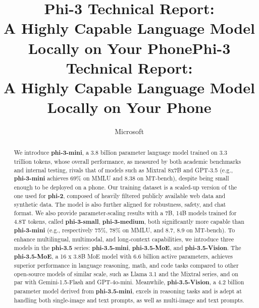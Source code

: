 \title{Phi-3 Technical Report: \\
A Highly Capable Language Model Locally on Your Phone}



\title{Phi-3 Technical Report: \\
A Highly Capable Language Model Locally on Your Phone}

\author{Microsoft}
\date{}

\maketitle

\begin{abstract}
We introduce \textbf{phi-3-mini}, a 3.8 billion parameter language model trained on 3.3 trillion tokens, whose overall performance, as measured by both academic benchmarks and internal testing, rivals that of models such as Mixtral 8x7B and GPT-3.5 (e.g., \textbf{phi-3-mini} achieves 69\% on MMLU and 8.38 on MT-bench), despite being small enough to be deployed on a phone. Our training dataset is a scaled-up version of the one used for \textbf{phi-2}, composed of heavily filtered publicly available web data and synthetic data. The model is also further aligned for robustness, safety, and chat format.
We also provide parameter-scaling results with a 7B, 14B models trained for 4.8T tokens, called \textbf{phi-3-small}, \textbf{phi-3-medium}, both significantly more capable than \textbf{phi-3-mini} (e.g., respectively 75\%, 78\% on MMLU, and 8.7, 8.9 on MT-bench).
To enhance multilingual, multimodal, and long-context capabilities, we introduce three models in the \textbf{phi-3.5} series: \textbf{phi-3.5-mini}, \textbf{phi-3.5-MoE}, and \textbf{phi-3.5-Vision}. The \textbf{phi-3.5-MoE}, a 16 x 3.8B MoE model with 6.6 billion active parameters, achieves superior performance in language reasoning, math, and code tasks compared to other open-source models of similar scale, such as Llama 3.1 and the Mixtral series, and on par with Gemini-1.5-Flash and GPT-4o-mini. Meanwhile, \textbf{phi-3.5-Vision}, a 4.2 billion parameter model derived from \textbf{phi-3.5-mini}, excels in reasoning tasks and is adept at handling both single-image and text prompts, as well as multi-image and text prompts.

\end{abstract}


